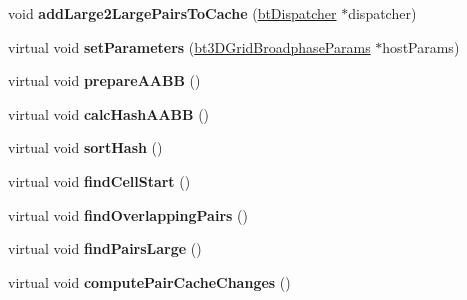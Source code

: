 \begin{DoxyCompactItemize}
\item 
\hypertarget{classbt_gpu3_d_grid_broadphase_ad0bb78dee2cd822d0fa687ea5aa72a21}{void {\bfseries add\+Large2\+Large\+Pairs\+To\+Cache} (\hyperlink{classbt_dispatcher}{bt\+Dispatcher} $\ast$dispatcher)}\label{classbt_gpu3_d_grid_broadphase_ad0bb78dee2cd822d0fa687ea5aa72a21}

\item 
\hypertarget{classbt_gpu3_d_grid_broadphase_ab28568e76e171d94d482fe81f860281e}{virtual void {\bfseries set\+Parameters} (\hyperlink{structbt3_d_grid_broadphase_params}{bt3\+D\+Grid\+Broadphase\+Params} $\ast$host\+Params)}\label{classbt_gpu3_d_grid_broadphase_ab28568e76e171d94d482fe81f860281e}

\item 
\hypertarget{classbt_gpu3_d_grid_broadphase_a6c083d06a439c7c4a9218c4e336e0622}{virtual void {\bfseries prepare\+A\+A\+B\+B} ()}\label{classbt_gpu3_d_grid_broadphase_a6c083d06a439c7c4a9218c4e336e0622}

\item 
\hypertarget{classbt_gpu3_d_grid_broadphase_a80159f60d018c65850a7fdacaf582930}{virtual void {\bfseries calc\+Hash\+A\+A\+B\+B} ()}\label{classbt_gpu3_d_grid_broadphase_a80159f60d018c65850a7fdacaf582930}

\item 
\hypertarget{classbt_gpu3_d_grid_broadphase_a359392ed2ccfeebbc7fe619979c5f969}{virtual void {\bfseries sort\+Hash} ()}\label{classbt_gpu3_d_grid_broadphase_a359392ed2ccfeebbc7fe619979c5f969}

\item 
\hypertarget{classbt_gpu3_d_grid_broadphase_ae77c39ed454a00219955ff434a3e461e}{virtual void {\bfseries find\+Cell\+Start} ()}\label{classbt_gpu3_d_grid_broadphase_ae77c39ed454a00219955ff434a3e461e}

\item 
\hypertarget{classbt_gpu3_d_grid_broadphase_a3ab912cd45cf3a884bda07a530c45170}{virtual void {\bfseries find\+Overlapping\+Pairs} ()}\label{classbt_gpu3_d_grid_broadphase_a3ab912cd45cf3a884bda07a530c45170}

\item 
\hypertarget{classbt_gpu3_d_grid_broadphase_a6884baa0fc33a33b90ab2e740232e6b6}{virtual void {\bfseries find\+Pairs\+Large} ()}\label{classbt_gpu3_d_grid_broadphase_a6884baa0fc33a33b90ab2e740232e6b6}

\item 
\hypertarget{classbt_gpu3_d_grid_broadphase_a3af6e9b44de069f6eb21c835c209b0c5}{virtual void {\bfseries compute\+Pair\+Cache\+Changes} ()}\label{classbt_gpu3_d_grid_broadphase_a3af6e9b44de069f6eb21c835c209b0c5}


\end{DoxyCompactItemize}
